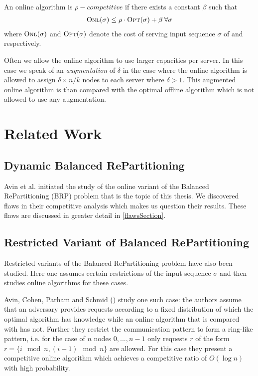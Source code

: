 \documentclass[a4paper,xcolor=dvipsnames, tikz, 12pt]{article}
\newcommand{\nl}{\newline}
\newcommand{\crep}{\text{C{\scriptsize REP}}}
\newcommand{\opt}{\text{O{\scriptsize PT}}}
\newcommand{\onl}{\text{O{\scriptsize NL}}}
\theoremstyle{definition}
\begin{document}
	An online algorithm \onl{} is $\rho-competitive$ if there exists a constant $\beta$ such that 
	\begin{align*}
	\onl{}(\sigma)\leq\rho\cdot \opt{}(\sigma)+\beta\:\forall \sigma
	\end{align*} 
	where $\onl{}(\sigma)$ and $\opt{}(\sigma)$ denote the cost of serving input sequence $\sigma$ of \onl{} and \opt{} respectively.
	
	Often we allow the online algorithm to use larger capacities per server. In this case we speak of an \textit{augmentation} of $\delta$ in the case where the online algorithm is allowed to assign $\delta\times n/k$ nodes to each server where $\delta>1$. This augmented online algorithm is than compared with the optimal offline algorithm \opt{} which is not allowed to use any augmentation.
	
	\section{Related Work}
	\subsection{Dynamic Balanced RePartitioning}
	Avin et al.\cite{Avin2015a} initiated the study of the online variant of the Balanced RePartitioning (BRP) problem that is the topic of this thesis. We discovered flaws in their competitive analysis which makes us question their results. These flaws are discussed in greater detail in \cref{flawsSection}. %
	
	\subsection{Restricted Variant of Balanced RePartitioning}
	Restricted variants of the Balanced RePartitioning problem have also been studied. Here one assumes certain restrictions of the input sequence $\sigma$ and then studies online algorithms for these cases. 
	
	Avin, Cohen, Parham and Schmid (\cite{Avin2018}) study one such case: the authors assume that an adversary provides requests according to a fixed distribution of which the optimal algorithm \opt{} has knowledge while an online algorithm that is compared with \opt{} has not. Further they restrict the communication pattern to form a ring-like pattern, i.e. for the case of $n$ nodes $0,...,n-1$ only requests $r$ of the form $r=\{i \mod n, (i+1)\mod n\}$ are allowed. For this case they present a competitive online algorithm which achieves a competitive ratio of $O(\log n)$ with high probability.	
	
\end{document}
